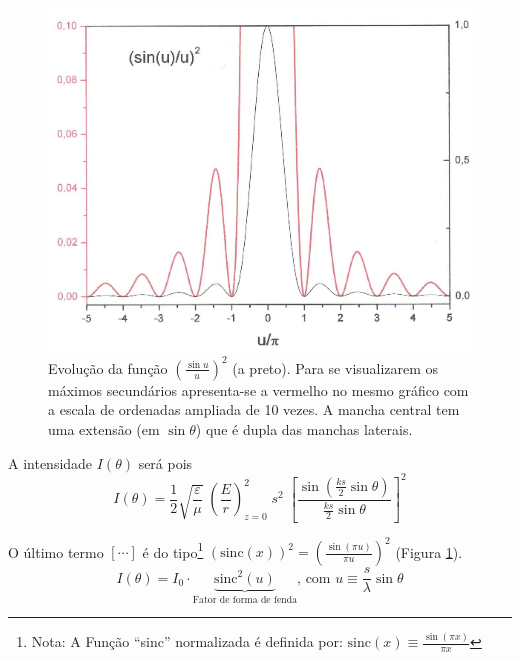 \documentclass[a4paper,12pt]{article}
\begin{document}
\begin{figure}[htb]  \centering 
	\includegraphics[width=0.7
	\textwidth]{figura4.png} \caption{
	Evolução da função $\left( \frac{\sin u}{u} \right)^2 $ (a preto). Para se visualizarem os máximos secundários apresenta-se a vermelho no mesmo gráfico com a escala de ordenadas ampliada de 10 vezes.
A mancha central tem uma extensão (em $\sin \theta$) que é dupla das manchas laterais. \label{fig:4}} 
\end{figure}

A intensidade $I(\theta)$ será pois
\begin{equation}
	\label{eq:31} I(\theta) = \frac{1}{2}\sqrt{\frac{ \varepsilon}{\mu}} \; \left( \frac{E}{r} \right)_{z=0}^2 \; s^2 \; 
	\left[ \frac{ \sin( \frac{k s}{2}\sin \theta)}{ \frac{k s}{2}\sin \theta} \right]^2 
\end{equation}

O último termo $\left[ \cdots \right] $  é do tipo\footnote{Nota: A Função “sinc” normalizada é definida por: 
$\mathrm{sinc}(x) \equiv \frac{\sin (\pi x)}{\pi x}$}
 $\left(\mathrm{sinc}(x)\right)^2 = \left(\frac{\sin (\pi u)}{\pi u}\right)^2  $ (Figura \ref{fig:4}).
\begin{equation}
	\label{eq:32} I(\theta) = I_0 \cdot \underbrace{ \mathrm{sinc}^2(u)}_\text{Fator de forma de fenda} \text{, com } u\equiv \frac{s}{\lambda} \sin \theta 
\end{equation}
\end{document}
